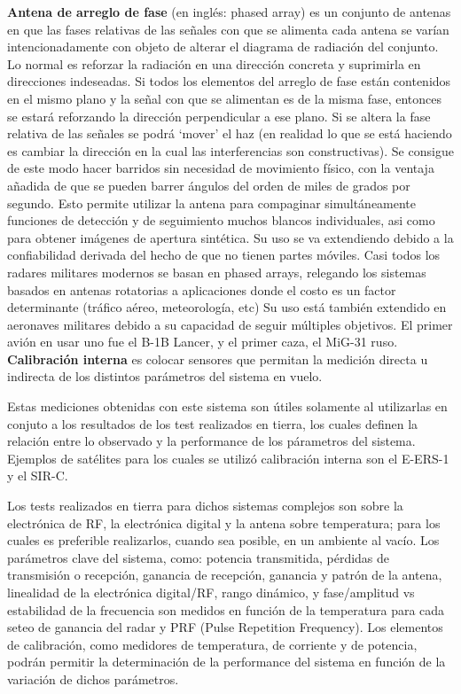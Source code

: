 {\textbf{Antena de arreglo de fase}} (en inglés: phased array) es un conjunto de antenas en que las fases relativas de las 
señales con que se alimenta cada antena se varían intencionadamente con objeto de alterar el diagrama de radiación del 
conjunto. Lo normal es reforzar la radiación en una dirección concreta y suprimirla en direcciones indeseadas. Si todos los 
elementos del arreglo de fase están contenidos en el mismo plano y la señal con que se alimentan es de la misma fase, 
entonces se estará reforzando la dirección perpendicular a ese plano. Si se altera la fase relativa de las señales se podrá
\enquote*{mover} el haz (en realidad lo que se está haciendo es cambiar la dirección en la cual las interferencias son 
constructivas). Se consigue de este modo hacer barridos sin necesidad de movimiento físico, con la ventaja añadida de que 
se pueden barrer ángulos del orden de miles de grados por segundo. Esto permite utilizar la antena para compaginar 
simultáneamente funciones de detección y de seguimiento muchos blancos individuales, asi como para obtener imágenes de 
apertura sintética. Su uso se va extendiendo debido a la confiabilidad derivada del hecho de que no tienen partes móviles. 
Casi todos los radares militares modernos se basan en phased arrays, relegando los sistemas basados en antenas rotatorias a 
aplicaciones donde el costo es un factor determinante (tráfico aéreo, meteorología, etc) Su uso está también extendido en
aeronaves militares debido a su capacidad de seguir múltiples objetivos. El primer avión en usar uno fue el B-1B Lancer, y 
el primer caza, el MiG-31 ruso.\\

{\textbf{Calibración interna}} es colocar sensores que permitan la medición directa u indirecta de los distintos parámetros 
del sistema en vuelo. 

Estas mediciones obtenidas con este sistema son útiles solamente al utilizarlas en conjuto a los resultados de los test 
realizados en tierra, los cuales definen la relación entre lo observado y la performance de los párametros del sistema. 
Ejemplos de satélites para los cuales se utilizó calibración interna son el E-ERS-1 y el SIR-C.
    
Los tests realizados en tierra para dichos sistemas complejos son sobre la electrónica de RF, la electrónica digital y la 
antena sobre temperatura; para los cuales es preferible realizarlos, cuando sea posible, en un ambiente al vacío. Los 
parámetros clave del sistema, como: potencia transmitida, pérdidas de transmisión o recepción, ganancia de recepción, 
ganancia y patrón de la antena, linealidad de la electrónica digital/RF, rango dinámico, y fase/amplitud vs estabilidad de la 
frecuencia son medidos en función de la temperatura para cada seteo de ganancia del radar y PRF (Pulse Repetition Frequency). 
Los elementos de calibración, como medidores de temperatura, de corriente y de potencia, podrán permitir la determinación de 
la performance del sistema en función de la variación de dichos parámetros.
    
